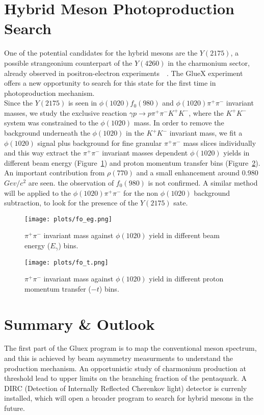 \documentclass[a4paper]{jpconf}
\begin{document}
\section{Hybrid Meson Photoproduction Search}
One of the potential candidates for the hybrid mesons are the $Y(2175)$, a possible strangeonium counterpart of the $Y(4260)$ in the charmonium sector, already observed in positron-electron experiments~\cite{ref.6}~\cite{ref.7}. The GlueX experiment offers a new opportunity to search for this state for the first time in photoproduction mechanism.\\
Since the $Y(2175)$ is seen in $\phi(1020)f_{0}(980)$ and $\phi(1020)\pi^{+}\pi^{-}$ invariant masses, we study the exclusive reaction $\gamma p \rightarrow p \pi^{+}\pi^{-}K^{+}K^{-}$, where the $K^{+}K^{-}$ system was constrained to the $\phi(1020)$ mass. In order to remove the background underneath the $\phi(1020)$ in the $K^{+}K^{-}$ invariant mass, we fit a $\phi(1020)$ signal plus background for fine granular $\pi^{+}\pi^{-}$ mass slices individually and this way extract the $\pi^{+}\pi^{-}$ invariant masses dependent $\phi(1020)$ yields in different beam energy (Figure~\ref{fig.7}) and proton momentum transfer bins (Figure~\ref{fig.8}). An important contribution from $\rho(770)$ and a small enhancement around 0.980 $Gev/c^{2}$ are seen. the observation of $f_{0}(980)$ is not confirmed. A similar method will be applied to the $\phi(1020)\pi^{+}\pi^{-}$ for the non $\phi(1020)$ background subtraction, to look for the presence of the $Y(2175)$ sate.

\begin{figure}[h]
    \centering
    \texttt{[image: plots/fo\_eg.png]}
    \caption{\label{fig.7}$\pi^{+}\pi^{-}$ invariant mass against $\phi(1020)$ yield in different beam energy ($E_{\gamma}$) bins.}
\end{figure}

\begin{figure}[h]
    \centering
    \texttt{[image: plots/fo\_t.png]}
    \caption{\label{fig.8}$\pi^{+}\pi^{-}$ invariant mass against $\phi(1020)$ yield in different proton momentum transfer ($-t$) bins.}
\end{figure}

\section{Summary \& Outlook}
The first part of the Gluex program is to map the conventional meson spectrum, and this is achieved by beam asymmetry measurments to understand the production mechanism. An opportunistic study of charmonium production at threshold lead to upper limits on the branching fraction of the pentaquark. A DIRC (Detection of Internally Reflected Cherenkov light) detector is currenly installed, which will open a broader program to search for hybrid mesons in the future.
\end{document}
